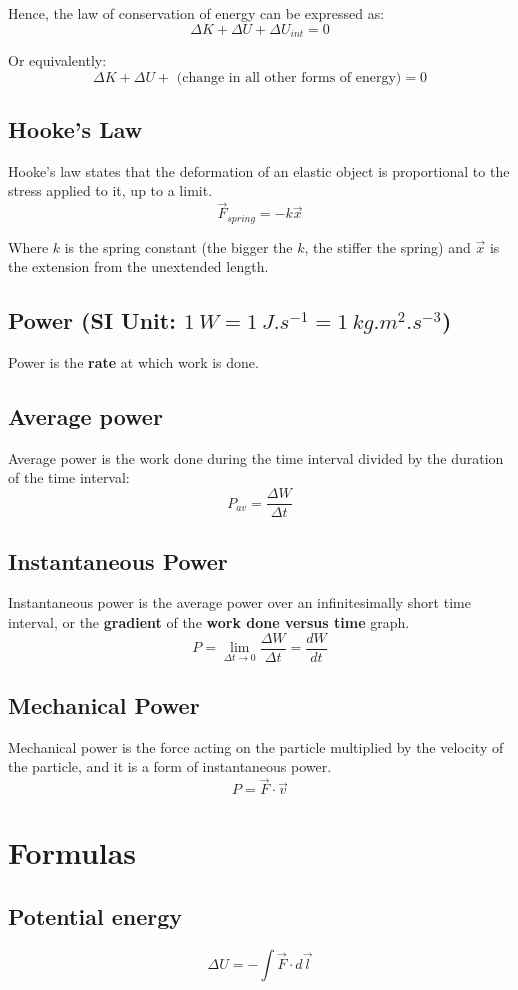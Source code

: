 \documentclass[11pt]{article}
\begin{document}
Hence, the law of conservation of energy can be expressed as:
\[\Delta K + \Delta U + \Delta U_{int} = 0\]

Or equivalently:
\[\Delta K + \Delta U + \text{ (change in all other forms of energy)} = 0\]
\subsection{Hooke's Law}
\label{sec:org606cf02}
Hooke's law states that the deformation of an elastic object is proportional to the stress applied to it, up to a limit.
\[\vec{F}_{spring} = - k \vec{x}\]

Where \(k\) is the spring constant (the bigger the \(k\), the stiffer the spring) and \(\vec{x}\) is the extension from the unextended length.
\subsection{Power (SI Unit: \(\qty{1}{\unit{W}} = \qty{1}{\unit{J.s^{-1}}} = \qty{1}{\unit{kg.m^2.s^{-3}}}\))}
\label{sec:orgfa5fee7}
Power is the \textbf{rate} at which work is done.
\subsection{Average power}
\label{sec:org2c7ab8a}
Average power is the work done during the time interval divided by the duration of the time interval:
\[P_{av} = \frac{\Delta W}{\Delta t}\]
\subsection{Instantaneous Power}
\label{sec:org07629e8}
Instantaneous power is the average power over an infinitesimally short time interval, or the \textbf{gradient} of the \textbf{work done versus time} graph.
\[P = \lim_{\Delta t \rightarrow 0} \frac{\Delta W}{\Delta t} = \frac{dW}{dt}\]
\subsection{Mechanical Power}
\label{sec:org9ee2e8e}
Mechanical power is the force acting on the particle multiplied by the velocity of the particle, and it is a form of instantaneous power.
\[P = \vec{F} \cdot \vec{v}\]
\section{Formulas}
\label{sec:org9d031a3}

\subsection{Potential energy}
\label{sec:org1f8ff70}
\[\Delta U = - \int \vec{F} \cdot d \vec{l}\]
\end{document}
